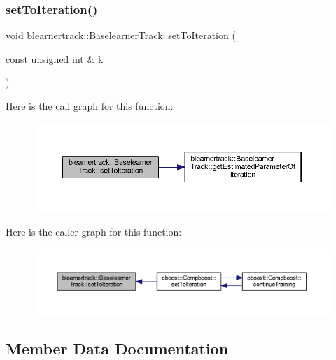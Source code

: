 \subsubsection{\texorpdfstring{set\+To\+Iteration()}{setToIteration()}}
{\footnotesize\ttfamily void blearnertrack\+::\+Baselearner\+Track\+::set\+To\+Iteration (\begin{DoxyParamCaption}\item[{const unsigned int \&}]{k }\end{DoxyParamCaption})}

Here is the call graph for this function\+:\nopagebreak
\begin{figure}[H]
\begin{center}
\leavevmode
\includegraphics[width=350pt]{classblearnertrack_1_1_baselearner_track_a06f0ac986a158eecddce64e6c7af0750_cgraph}
\end{center}
\end{figure}
Here is the caller graph for this function\+:\nopagebreak
\begin{figure}[H]
\begin{center}
\leavevmode
\includegraphics[width=350pt]{classblearnertrack_1_1_baselearner_track_a06f0ac986a158eecddce64e6c7af0750_icgraph}
\end{center}
\end{figure}


\subsection{Member Data Documentation}
\mbox{\label{classblearnertrack_1_1_baselearner_track_ad37a3a99c04778146256e50c44f2a292}} 
